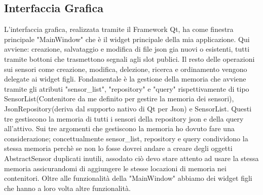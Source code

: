 \documentclass{article}
\begin{document}
\subsection{Interfaccia Grafica}
L'interfaccia grafica, realizzata tramite il Framework Qt, ha come finestra principale "MainWindow" che è il widget principale della mia applicazione. Qui avviene: creazione, salvataggio e modifica di file json gia nuovi o esistenti, tutti tramite bottoni che trasmettono segnali agli slot publici. Il resto delle operazioni sui sensori come creazione, modifica, delezione, ricerca e ordinamento vengono delegate ai widget figli. Fondamentale è la gestione della memoria che avviene tramite gli atributi "sensor\_list", "repository" e "query" rispettivamente di tipo SensorList(Contenitore da me definito per gestire la memoria dei sensori), JsonRepository(deriva dal supporto nativo di Qt per Json) e SensorList. Questi tre gestiscono la memoria di tutti i sensori della repository json e della query all'attivo. Sui tre argomenti che gestiscono la memoria ho dovuto fare una considerazione; concettualmente sensor\_list, repository e query condividono la stessa memoria perchè se non lo fosse dovrei andare a creare degli oggetti AbstractSensor duplicati inutili, assodato ciò devo stare attento ad usare la stessa memoria assicurandomi di aggiungere le stesse locazioni di memoria nei contenitori. 
Oltre alle funzionalità della "MainWindow" abbiamo dei widget figli che hanno a loro volta altre funzionalità.
\end{document}

